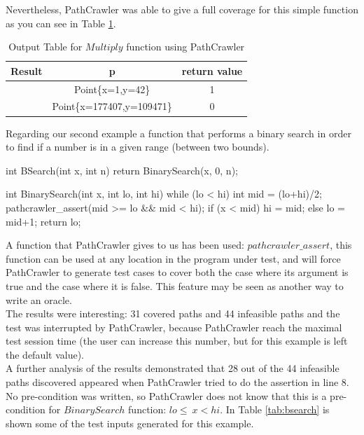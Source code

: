 \documentclass[a4paper,UKenglish]{oasics}
\newcommand{\checkK}{\color{green}\checkmark}
\begin{document}
Nevertheless, PathCrawler was able to give a full coverage for this simple function as you can see in Table \ref{tab:mul}.

\begin{table}[!ht]
\renewcommand{\arraystretch}{1.3}
\setlength{\tabcolsep}{10pt}
\caption{Output Table for $Multiply$ function using PathCrawler}
\label{tab:mul}
\centering
\noindent \begin{tabular}{|c|c|c|}\hline
Result & p & return value\\\hline
\checkK & Point\{x=1,y=42\} & 1 \\\hline
\checkK & Point\{x=177407,y=109471\} & 0 \\\hline
\end{tabular}
\end{table}

Regarding our second example a function that performs a binary search in order to find if a number is in a given range (between two bounds).

\begin{code}
int BSearch(int x, int n) {
    return BinarySearch(x, 0, n); 
}
	
int BinarySearch(int x, int lo, int hi) {
    while (lo < hi) {
        int mid = (lo+hi)/2;
        pathcrawler_assert(mid >= lo && mid < hi);
        if (x < mid) { hi = mid; }
		else { lo = mid+1; }
    }
    return lo; 
}
\end{code}
A function that PathCrawler gives to us has been used: $pathcrawler\_assert$, this function can be used at any location in the
program under test, and will force PathCrawler to generate test cases to cover both the case where its argument is true and the case where it is false.
This feature may be seen as another way to write an oracle.\\
The results were interesting: 31 covered paths and 44 infeasible paths and the test was interrupted by PathCrawler,
because PathCrawler reach the maximal test session time (the user can increase this number, but for this example is left the default value).\\
A further analysis of the results demonstrated that 28 out of the 44 infeasible paths discovered appeared when PathCrawler tried to
do the assertion in line 8. No pre-condition was written, so PathCrawler does not know that this is a pre-condition
for $BinarySearch$ function:  $lo\leq~x<hi$. In Table \ref{tab:bsearch} is shown some of the test inputs generated for this example.
\end{document}
